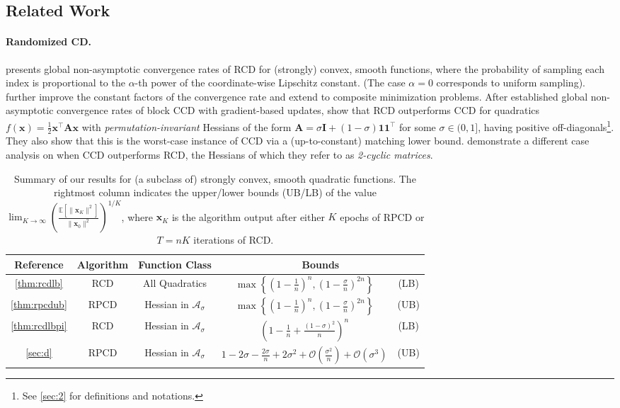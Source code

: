 \documentclass{article}
\theoremstyle{plain}
\theoremstyle{definition}
\theoremstyle{remark}
\def\bigopen#1{\left(#1\right)}
\def\bigset#1{\left\{#1\right\}}
\def\bigclosed#1{\left[#1\right]}
\def\vone{{\bm{1}}}
\def\vx{{\bm{x}}}
\def\mA{{\bm{A}}}
\def\mI{{\bm{I}}}
\def\gA{{\mathcal{A}}}
\def\gO{{\mathcal{O}}}
\newcommand{\E}{\mathbb{E}}
\begin{document}
\subsection{Related Work}

\paragraph{Randomized CD.}

\citet{nesterov12} presents global non-asymptotic convergence rates of RCD for (strongly) convex, smooth functions, where the probability of sampling each index is proportional to the $\alpha$-th power of the coordinate-wise Lipschitz constant.
(The case $\alpha = 0$ corresponds to uniform sampling).
\citet{richtarik11} further improve the constant factors of the convergence rate and extend to composite minimization problems.
After \citet{beck13} established global non-asymptotic convergence rates of block CCD with gradient-based updates, \citet{sun16} show that RCD outperforms CCD for quadratics $f(\vx) = \frac{1}{2} \vx^{\top} \mA \vx$ with \emph{permutation-invariant} Hessians of the form
$\mA = \sigma \mI + (1- \sigma) \vone \vone^{\top}$
for some $\sigma \in (0, 1]$, having positive off-diagonals\footnote{See \cref{sec:2} for definitions and notations.}.
They also show that this is the worst-case instance of CCD via a (up-to-constant) matching lower bound.
\citet{gurbuzbalaban17} demonstrate a different case analysis on when CCD outperforms RCD, the Hessians of which they refer to as \emph{2-cyclic matrices}. %

\begin{table}[tb]
    \centering
    \begin{tabular}{|c|c|c|cc|}
        \hline
        Reference & Algorithm & Function Class & \multicolumn{2}{|c|}{Bounds} \\
        \hline
        \hline
        \cref{thm:rcdlb} & RCD & All Quadratics & $\max \bigset{\bigopen{1 - \frac{1}{n}}^n\!\!\!, \bigopen{1 - \frac{\sigma}{n}}^{2n}}$ & (LB) \\
        \hline
        \cref{thm:rpcdub} & RPCD & Hessian in $\gA_{\sigma}$ & $\max \bigset{\bigopen{1 - \frac{1}{n}}^n\!\!\!, \bigopen{1 - \frac{\sigma}{n}}^{2n}}$ & (UB) \\
        \hline
        \cref{thm:rcdlbpi} & RCD & Hessian in $\gA_{\sigma}$ & $\bigopen{1 - \frac{1}{n} + \frac{(1 - \sigma)^2}{n}}^n$ & (LB) \\
        \hline
        \cref{sec:d} & RPCD & Hessian in $\gA_{\sigma}$ & $1 - 2 \sigma - \frac{2 \sigma}{n} + 2 \sigma^2 + \gO \bigopen{\frac{\sigma^2}{n}} + \gO \bigopen{\sigma^3}$ & (UB) \\
        \hline
    \end{tabular}
    \caption{Summary of our results for (a subclass of) strongly convex, smooth quadratic functions.
    The rightmost column indicates the upper/lower bounds (UB/LB) of the value $\lim_{K \to \infty} \bigopen{ \frac{\E \bigclosed{\| \vx_K \|^2}}{\| \vx_0 \|^2} }^{1/K}$, where $\vx_K$ is the algorithm output after either $K$ epochs of RPCD or $T = nK$ iterations of RCD.}
    \label{tab:summary}
\end{table}
\end{document}
